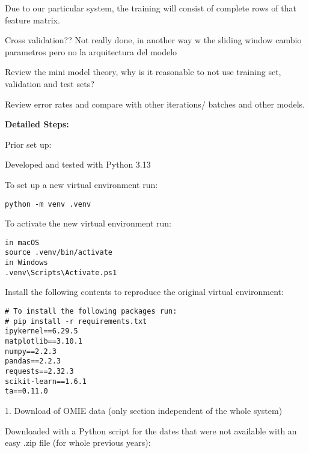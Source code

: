 \documentclass[12pt]{report} %
\begin{document}
Due to our particular system, the training will consist of complete rows of that feature matrix.

Cross validation?? Not really done, in another way w the sliding window
cambio parametros pero no la arquitectura del modelo

Review the mini model theory, why is it reasonable to not use training set, validation and test sets?

Review error rates and compare with other iterations/ batches and other models.

\noindent \textbf{Detailed Steps:}

Prior set up:

Developed and tested with Python 3.13 \cite{python}

To set up a new virtual environment \cite{python_venv} run:
\begin{verbatim}
python -m venv .venv
\end{verbatim}

To activate the new virtual environment run:
\begin{verbatim}
in macOS
source .venv/bin/activate
in Windows
.venv\Scripts\Activate.ps1
\end{verbatim}

Install the following contents to reproduce the original virtual environment:
\begin{verbatim}
# To install the following packages run:
# pip install -r requirements.txt 
ipykernel==6.29.5
matplotlib==3.10.1
numpy==2.2.3
pandas==2.2.3
requests==2.32.3
scikit-learn==1.6.1
ta==0.11.0
\end{verbatim}

1. Download of OMIE data (only section independent of the whole system)
\cite{omie_datos}

Downloaded with a Python script for the dates that were not available with an easy .zip file (for whole previous years):
\end{document}
